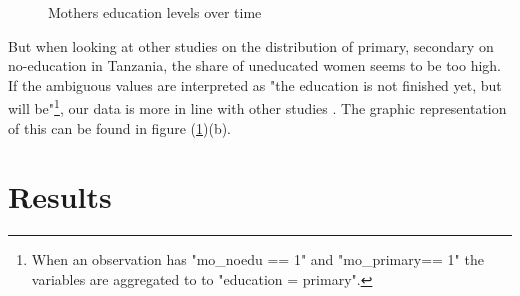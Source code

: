 \documentclass[a4paper, 11pt]{article} %
\begin{document}
\begin{figure}[h!]
    \centering
    \qquad
    \caption{Mothers education levels over time}%
    \label{fig:education_proportion}%
\end{figure}

But when looking at other studies on the distribution of primary, secondary on no-education in Tanzania, the share of uneducated women seems to be too high. If the ambiguous values are interpreted as "the education is not finished yet, but will be"\footnote{When an observation has "mo\_noedu == 1" and "mo\_primary== 1" the variables are aggregated to  to "education = primary".}, our data is more in line with other studies \cite{SAM08}. The graphic representation of this can be found in figure (\ref{fig:education_proportion})(b).  





\section{Results}
\end{document}
